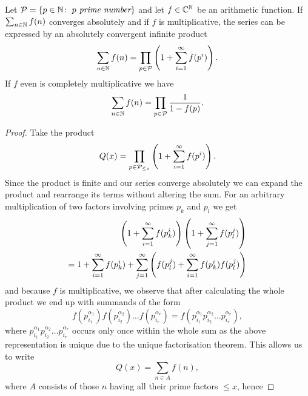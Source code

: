 \begin{theorem}
	Let $\mathcal{P} = \left\{p \in \mathbb{N} \colon \; p \textit{ prime number}\right\}$ and let $f \in \mathbb{C}^{\mathbb{N}}$ be an arithmetic function. If $\sum_{n \in \mathbb{N}} f(n)$ converges absolutely and if $f$ is multiplicative, the series can be expressed by an absolutely convergent infinite product
\begin{equation*}
	\sum_{n \in \mathbb{N}} f(n) = \prod_{p \in \mathcal{P}} \left(1 + \sum_{i = 1}^\infty f(p^i)\right).
\end{equation*}
	If $f$ even is completely multiplicative we have
\begin{equation*}
	\sum_{n \in \mathbb{N}} f(n) = \prod_{p \in \mathcal{P}} \frac{1}{1 - f(p)}.
\end{equation*}
\end{theorem}
\begin{proof}
	Take the product
\begin{equation*}
	Q(x) = \prod_{p \in \mathcal{P}_{\leq x}} \left(1 + \sum_{i = 1}^\infty f(p^i)\right).
\end{equation*}
	Since the product is finite and our series converge absolutely we can expand the product and rearrange its terms without altering the sum. For an arbitrary multiplication of two factors involving primes $p_k$ and $p_l$ we get
\begin{equation*}
\begin{aligned}		
	\left(1 + \sum_{i = 1}^\infty f(p_k^i)\right) \left(1 + \sum_{j = 1}^\infty f(p_l^j)\right) \\
	= 1 + \sum_{i = 1}^\infty f(p_k^i) + \sum_{j = 1}^\infty \left(f(p_l^j) + \sum_{i = 1}^\infty f(p_k^i) f(p_l^j)\right)
\end{aligned}
\end{equation*}
	and because $f$ is multiplicative, we observe that after calculating the whole product we end up with summands of the form
\begin{equation*}
	f(p_{i_1}^{\alpha_1})f(p_{i_2}^{\alpha_2}) \dots f(p_{i_r}^{\alpha_r}) = f(p_{i_1}^{\alpha_1} p_{i_2}^{\alpha_2} \dots p_{i_r}^{\alpha_r}),
\end{equation*}
	where $p_{i_1}^{\alpha_1} p_{i_2}^{\alpha_2} \dots p_{i_r}^{\alpha_r}$ occurs only once within the whole sum as the above representation is unique due to the unique factorisation theorem. This allows us to write
\begin{equation*}
	Q(x) = \sum_{n \in A} f(n),
\end{equation*}
	where $A$ consists of those $n$ having all their prime factors $\leq x$, hence

\end{proof}

